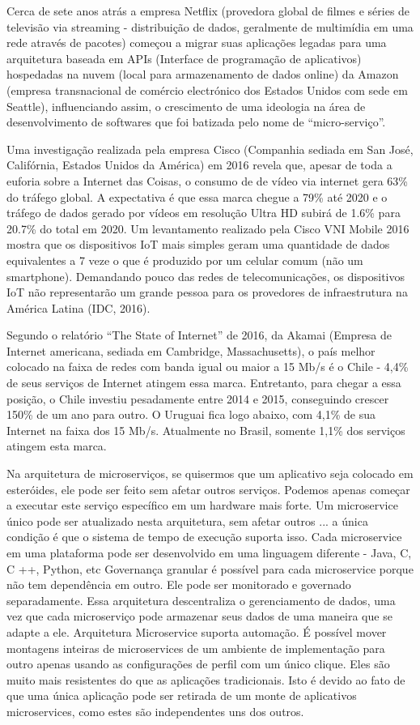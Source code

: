 Cerca de sete anos atrás a empresa Netflix (provedora global de filmes e séries de televisão via streaming - distribuição de dados, geralmente de multimídia em uma rede através de pacotes) começou a migrar suas aplicações legadas para uma arquitetura baseada em APIs (Interface de programação de aplicativos) hospedadas na nuvem (local para armazenamento de dados online) da Amazon (empresa transnacional de comércio electrónico dos Estados Unidos com sede em Seattle), influenciando assim, o crescimento de uma ideologia na área de desenvolvimento de softwares que foi batizada pelo nome de “micro-serviço”.

Uma investigação realizada pela empresa Cisco (Companhia sediada em San José, Califórnia, Estados Unidos da América) em 2016 revela que, apesar de toda a euforia sobre a Internet das Coisas, o consumo de de vídeo via internet gera 63\% do tráfego global. A expectativa é que essa marca chegue a 79\% até 2020 e o tráfego de dados gerado por vídeos em resolução Ultra HD subirá de 1.6\% para 20.7\% do total em 2020. Um levantamento realizado pela Cisco VNI Mobile 2016 mostra que os dispositivos IoT mais simples geram uma quantidade de dados equivalentes a 7 veze o que é produzido por um celular comum (não um smartphone). Demandando pouco das redes de telecomunicações, os dispositivos IoT não representarão um grande pessoa para os provedores de infraestrutura na América Latina (IDC, 2016). 

Segundo o relatório “The State of Internet” de 2016, da Akamai (Empresa de Internet americana, sediada em Cambridge, Massachusetts), o país melhor colocado na faixa de redes com banda igual ou maior a 15 Mb/s é o Chile - 4,4\% de seus serviços de Internet atingem essa marca. Entretanto, para chegar a essa posição, o Chile investiu pesadamente entre 2014 e 2015, conseguindo crescer 150\% de um ano para outro. O Uruguai fica logo abaixo, com 4,1\% de sua Internet na faixa dos 15 Mb/s. Atualmente no Brasil, somente 1,1\% dos serviços atingem esta marca.

Na arquitetura de microserviços, se quisermos que um aplicativo seja colocado em esteróides, ele pode ser feito sem afetar outros serviços. Podemos apenas começar a executar este serviço específico em um hardware mais forte. Um microservice único pode ser atualizado nesta arquitetura, sem afetar outros ... a única condição é que o sistema de tempo de execução suporta isso. Cada microservice em uma plataforma pode ser desenvolvido em uma linguagem diferente - Java, C, C ++, Python, etc Governança granular é possível para cada microservice porque não tem dependência em outro. Ele pode ser monitorado e governado separadamente. Essa arquitetura descentraliza o gerenciamento de dados, uma vez que cada microserviço pode armazenar seus dados de uma maneira que se adapte a ele. Arquitetura Microservice suporta automação. É possível mover montagens inteiras de microservices de um ambiente de implementação para outro apenas usando as configurações de perfil com um único clique. Eles são muito mais resistentes do que as aplicações tradicionais. Isto é devido ao fato de que uma única aplicação pode ser retirada de um monte de aplicativos microservices, como estes são independentes uns dos outros.

